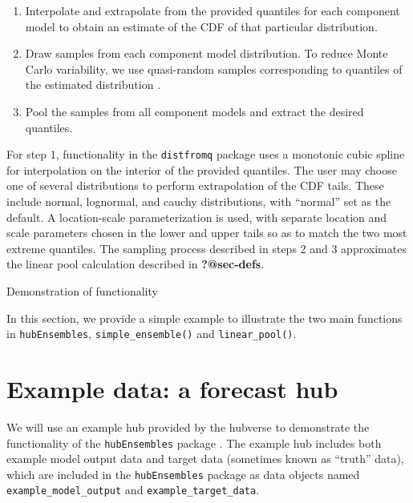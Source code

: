 \documentclass[
  article,
  shortnames,
  notitle]{jss}
\providecommand{\tightlist}{%
  \setlength{\itemsep}{0pt}\setlength{\parskip}{0pt}}\usepackage{longtable,booktabs,array}
\begin{document}
\begin{enumerate}
\def\labelenumi{\arabic{enumi}.}
\tightlist
\item
  Interpolate and extrapolate from the provided quantiles for each
  component model to obtain an estimate of the CDF of that particular
  distribution.
\item
  Draw samples from each component model distribution. To reduce Monte
  Carlo variability, we use quasi-random samples corresponding to
  quantiles of the estimated distribution
  \citep{niederreiter1992quasirandom}.
\item
  Pool the samples from all component models and extract the desired
  quantiles.
\end{enumerate}

For step 1, functionality in the \texttt{distfromq} package uses a
monotonic cubic spline for interpolation on the interior of the provided
quantiles. The user may choose one of several distributions to perform
extrapolation of the CDF tails. These include normal, lognormal, and
cauchy distributions, with ``normal'' set as the default. A
location-scale parameterization is used, with separate location and
scale parameters chosen in the lower and upper tails so as to match the
two most extreme quantiles. The sampling process described in steps 2
and 3 approximates the linear pool calculation described in
\textbf{?@sec-defs}.

Demonstration of functionality

In this section, we provide a simple example to illustrate the two main
functions in \texttt{hubEnsembles}, \texttt{simple\_ensemble()} and
\texttt{linear\_pool()}.

\section{Example data: a forecast
hub}\label{example-data-a-forecast-hub}

We will use an example hub provided by the hubverse to demonstrate the
functionality of the \texttt{hubEnsembles} package
\citep{hubverse_docs}. The example hub includes both example model
output data and target data (sometimes known as ``truth'' data), which
are included in the \texttt{hubEnsembles} package as data objects named
\texttt{example\_model\_output} and \texttt{example\_target\_data}.
\end{document}
